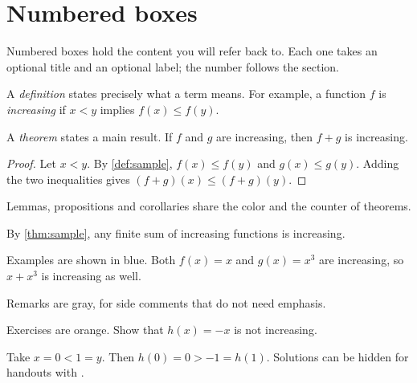 \section{Numbered boxes}\label{sec:boxes}

Numbered boxes hold the content you will refer back to. Each one takes an
optional title and an optional label; the number follows the section.

\begin{definition}
A \emph{definition} states precisely what a term means. For example, a
function $f$ is \emph{increasing} if $x < y$ implies $f(x) \le f(y)$.
\end{definition}

\begin{theorem}
A \emph{theorem} states a main result. If $f$ and $g$ are increasing, then
$f + g$ is increasing.
\end{theorem}

\begin{proof}
Let $x < y$. By \cref{def:sample}, $f(x) \le f(y)$ and $g(x) \le g(y)$.
Adding the two inequalities gives $(f + g)(x) \le (f + g)(y)$.
\end{proof}

\begin{lemma}
Lemmas, propositions and corollaries share the color and the counter of
theorems.
\end{lemma}

\begin{corollary}
By \cref{thm:sample}, any finite sum of increasing functions is increasing.
\end{corollary}

\begin{example}[][ex:sample]
Examples are shown in blue. Both $f(x) = x$ and $g(x) = x^3$ are increasing,
so $x + x^3$ is increasing as well.
\end{example}

\begin{remark}
Remarks are gray, for side comments that do not need emphasis.
\end{remark}

\begin{exercise}
Exercises are orange. Show that $h(x) = -x$ is not increasing.
\end{exercise}

\begin{solution}
Take $x = 0 < 1 = y$. Then $h(0) = 0 > -1 = h(1)$. Solutions can be hidden
for handouts with \code{\showsolutionsfalse}.
\end{solution}
